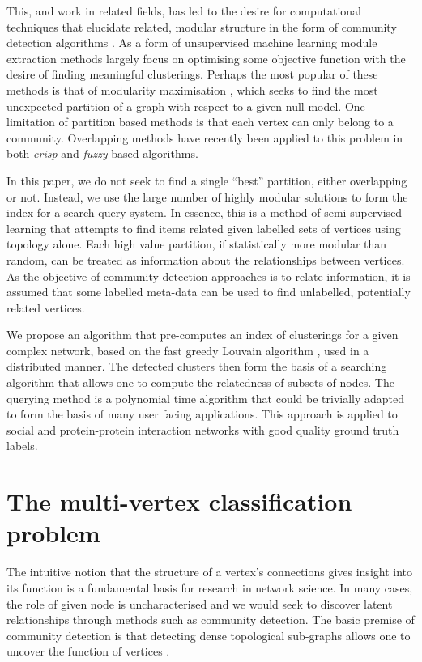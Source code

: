 \documentclass[sigconf]{acmart}
\begin{document}
This, and work in related fields, has led to the desire for computational techniques that elucidate related, modular structure in the form of community detection algorithms \cite{fortunato2010community}.
As a form of unsupervised machine learning module extraction methods largely focus on optimising some objective function with the desire of finding meaningful clusterings.
Perhaps the most popular of these methods is that of modularity maximisation \cite{newman2004}, which seeks to find the most unexpected partition of a graph with respect to a given null model.
One limitation of partition based methods is that each vertex can only belong to a community.
Overlapping methods have recently been applied to this problem in both \textit{crisp} \cite{ahn2010link, lancichinetti2011finding} and \textit{fuzzy} \cite{gregory2011fuzzy} based algorithms.

In this paper, we do not seek to find a single ``best'' partition, either overlapping or not.
Instead, we use the large number of highly modular solutions to form the index for a search query system.
In essence, this is a method of semi-supervised learning that attempts to find items related given labelled sets of vertices using topology alone.
Each high value partition, if statistically more modular than random, can be treated as information about the relationships between vertices.
As the objective of community detection approaches is to relate information, it is assumed that some labelled meta-data can be used to find unlabelled, potentially related vertices.

We propose an algorithm that pre-computes an index of clusterings for a given complex network, based on the fast greedy Louvain algorithm \cite{blondel2008fast}, used in a distributed manner.
The detected clusters then form the basis of a searching algorithm that allows one to compute the relatedness of subsets of nodes.
The querying method is a polynomial time algorithm that could be trivially adapted to form the basis of many user facing applications.
This approach is applied to social and protein-protein interaction networks with good quality ground truth labels.

\section{The multi-vertex classification problem}
The intuitive notion that the structure of a vertex's connections gives insight into its function is a fundamental basis for research in network science.
In many cases, the role of given node is uncharacterised and we would seek to discover latent relationships through methods such as community detection.
The basic premise of community detection is that detecting dense topological sub-graphs allows one to uncover the function of vertices \cite{fortunato2010community}.
\end{document}
